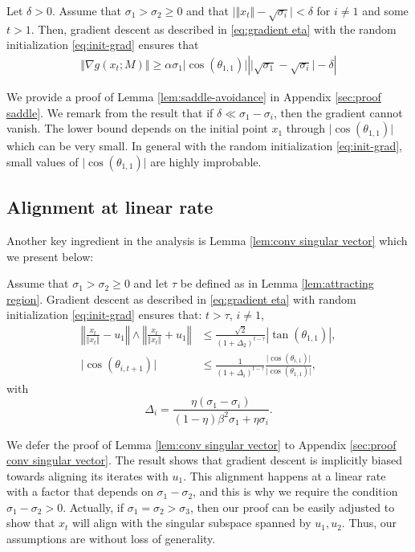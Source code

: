 \begin{lemma}\label{lem:saddle-avoidance}
    Let $\delta > 0$. Assume that $\sigma_1 > \sigma_2 \ge  0$ and that $\vert \Vert x_t \Vert - \sqrt{\sigma_i} \vert <  \delta $ for $i \neq 1$ and some $t >  1$. Then, gradient descent as described in \eqref{eq:gradient eta} with the random initialization \eqref{eq:init-grad} ensures that
    \begin{align}
        \Vert \nabla g(x_t; M)\Vert \ge   \alpha  \sigma_1 \vert \cos(\theta_{1,1})\vert \left\vert  \vert \sqrt{\sigma_1} - \sqrt{\sigma_i}\vert - \delta \right\vert 
    \end{align}
\end{lemma}

We provide a proof of Lemma \ref{lem:saddle-avoidance} in Appendix \ref{sec:proof saddle}. We remark from the result that if $\delta \ll \sigma_1 - \sigma_i$, then the gradient cannot vanish. The lower bound depends on the initial point $x_1$ through $\vert \cos(\theta_{1,1})\vert$ which can be very small. In general with the random initialization \eqref{eq:init-grad}, small values of  $\vert \cos(\theta_{1,1})\vert$ are highly improbable.  



  
\subsection{Alignment at linear rate}

Another key ingredient in the analysis is Lemma \ref{lem:conv singular vector} which we present below:

\begin{lemma}\label{lem:conv singular vector}
    Assume that $\sigma_1 > \sigma_2 \ge 0$ and let $\tau$ be defined as in Lemma \ref{lem:attracting region}. Gradient descent as described in \eqref{eq:gradient eta} with random initialization \eqref{eq:init-grad} ensures that: $t > \tau$, $i \neq 1$, 
    \begin{align*}
        \left\Vert \frac{x_t}{\Vert x_t \Vert}  -   u_1  \right\Vert \wedge \left\Vert \frac{x_t }{\Vert x_t \Vert} + u_1  \right\Vert & \le 
        \frac{\sqrt{2}}{(1 + \Delta_2)^{t-\tau}}  \left\vert \tan(\theta_{1, 1})\right\vert, \\
         \vert \cos(\theta_{i, t+1}) \vert  & \le \frac{1}{(1 + \Delta_i)^{t-\tau}}  \frac{\vert \cos(\theta_{i, 1}) \vert}{\vert \cos(\theta_{1, 1}) \vert}, 
    \end{align*}
    with 
    $$
    \Delta_i = \frac{\eta (\sigma_1 - \sigma_i)}{(1-\eta) \beta^2 \sigma_1   + \eta \sigma_i}. 
    $$ 
\end{lemma}
We defer the proof of Lemma \ref{lem:conv singular vector} to Appendix \ref{sec:proof conv singular vector}. The result shows that gradient descent is implicitly biased towards aligning its iterates with $u_1$. This alignment happens at a linear rate with a factor that depends on $\sigma_1 - \sigma_2$, and this is why we require the condition $\sigma_1 - \sigma_2 > 0$. Actually, if $\sigma_1 = \sigma_2 > \sigma_3$, then our proof can be easily adjusted to show that $x_t$ will align with the singular subspace spanned by $u_1, u_2$. Thus, our assumptions are without loss of generality.   


